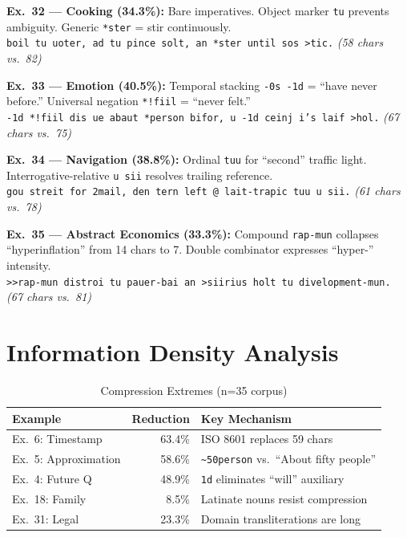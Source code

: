 \documentclass[10pt,onecolumn,letterpaper]{article}
\newcommand{\me}[1]{\texttt{#1}}
\begin{document}
\textbf{Ex.~32 --- Cooking (34.3\%):} Bare imperatives. Object marker \me{tu} prevents ambiguity. Generic \me{*ster} = stir continuously.\\
\me{boil tu uoter, ad tu pince solt, an *ster until sos >tic.} \textit{(58 chars vs.\ 82)}

\textbf{Ex.~33 --- Emotion (40.5\%):} Temporal stacking \me{-0s -1d} = ``have never before.'' Universal negation \me{*!fiil} = ``never felt.''\\
\me{-1d *!fiil dis ue abaut *person bifor, u -1d ceinj i's laif >hol.} \textit{(67 chars vs.\ 75)}

\textbf{Ex.~34 --- Navigation (38.8\%):} Ordinal \me{tuu} for ``second'' traffic light. Interrogative-relative \me{u sii} resolves trailing reference.\\
\me{gou streit for 2mail, den tern left @ lait-trapic tuu u sii.} \textit{(61 chars vs.\ 78)}

\textbf{Ex.~35 --- Abstract Economics (33.3\%):} Compound \me{rap-mun} collapses ``hyperinflation'' from 14 chars to 7. Double combinator expresses ``hyper-'' intensity.\\
\me{>>rap-mun distroi tu pauer-bai an >siirius holt tu divelopment-mun.} \textit{(67 chars vs.\ 81)}

\section{Information Density Analysis}

\begin{table}[h!]
\centering\small
\begin{tabularx}{\linewidth}{lrX}
\toprule
\textbf{Example} & \textbf{Reduction} & \textbf{Key Mechanism} \\
\midrule
Ex.~6: Timestamp     & 63.4\% & ISO 8601 replaces 59 chars \\
Ex.~5: Approximation & 58.6\% & \me{\~{}50person} vs.\ ``About fifty people'' \\
Ex.~4: Future Q      & 48.9\% & \me{1d} eliminates ``will'' auxiliary \\
\midrule
Ex.~18: Family       &  8.5\% & Latinate nouns resist compression \\
Ex.~31: Legal        & 23.3\% & Domain transliterations are long \\
\bottomrule
\end{tabularx}
\caption{Compression Extremes (n=35 corpus)}
\end{table}
\end{document}
